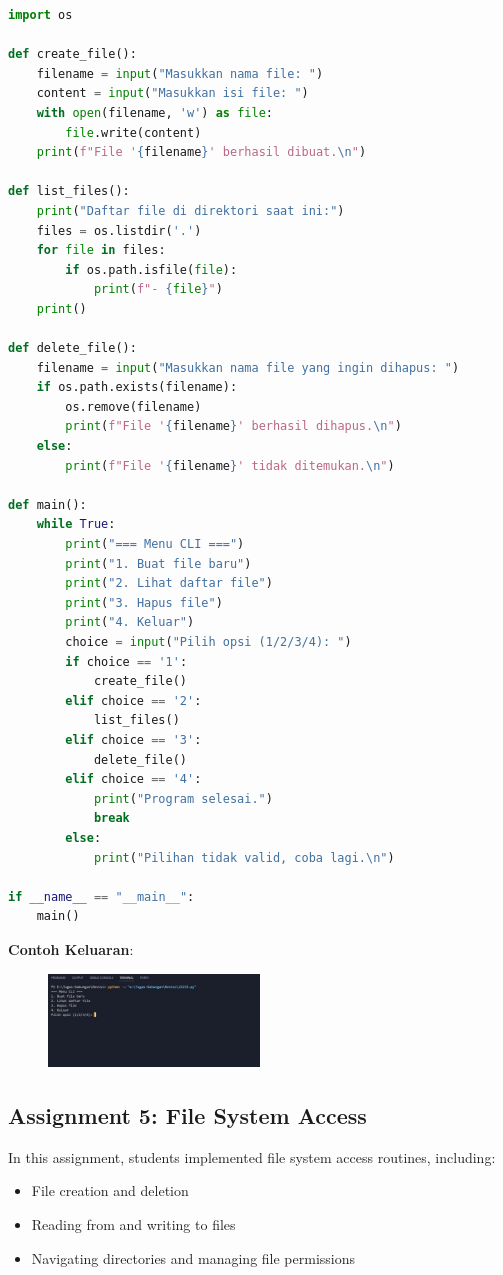 \documentclass[12pt]{article}
\begin{document}
\begin{lstlisting}[language=Python]
import os  

def create_file():
    filename = input("Masukkan nama file: ")
    content = input("Masukkan isi file: ")
    with open(filename, 'w') as file:
        file.write(content)
    print(f"File '{filename}' berhasil dibuat.\n")

def list_files():
    print("Daftar file di direktori saat ini:")
    files = os.listdir('.')  
    for file in files:
        if os.path.isfile(file):  
            print(f"- {file}")
    print()

def delete_file():
    filename = input("Masukkan nama file yang ingin dihapus: ")
    if os.path.exists(filename): 
        os.remove(filename)
        print(f"File '{filename}' berhasil dihapus.\n")
    else:
        print(f"File '{filename}' tidak ditemukan.\n")

def main():
    while True:
        print("=== Menu CLI ===")
        print("1. Buat file baru")
        print("2. Lihat daftar file")
        print("3. Hapus file")
        print("4. Keluar")
        choice = input("Pilih opsi (1/2/3/4): ")
        if choice == '1':
            create_file()
        elif choice == '2':
            list_files()
        elif choice == '3':
            delete_file()
        elif choice == '4':
            print("Program selesai.")
            break
        else:
            print("Pilihan tidak valid, coba lagi.\n")

if __name__ == "__main__":
    main()
\end{lstlisting}


\textbf{Contoh Keluaran}:


\begin{figure}[h]
    \centering
    \includegraphics[width=0.5\textwidth]{asset/Output_Asignment4.jpg}
    \label{fig:contohgambar}
\end{figure}



\subsection{Assignment 5: File System Access}
In this assignment, students implemented file system access routines, including:
\begin{itemize}
    \item File creation and deletion
    \item Reading from and writing to files
    \item Navigating directories and managing file permissions
\end{itemize}
\end{document}
